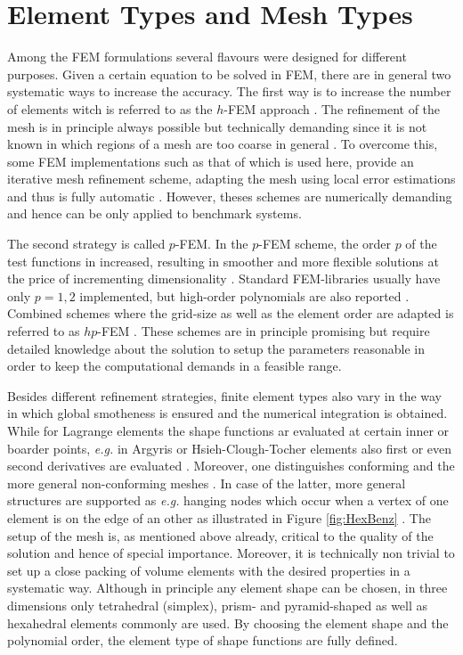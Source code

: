 \section{Element Types and Mesh Types}
\label{ch:feAss}
Among the FEM formulations several flavours were designed for different purposes.
Given a certain equation to be solved in FEM, there are in general two systematic ways to increase the accuracy.
The first way is to increase the number of elements witch is referred to as the $h$-FEM approach \cite{dreyer,}.
The refinement of the mesh is in principle always possible but technically demanding since it is not known in which regions of a mesh are too coarse in general \cite{dreyer}.
To overcome this, some FEM implementations such as that of  \cite{libmesh} which is used here, provide an iterative mesh refinement scheme, adapting the mesh using local error estimations and thus is fully automatic \cite{libmesh}.
However, theses schemes are numerically demanding and hence can be only applied to benchmark systems.

The second strategy is called $p$-FEM. 
In the $p$-FEM scheme, the order $p$ of the test functions in increased, resulting in smoother and more flexible solutions at the price of incrementing dimensionality \cite{p-fem}.
Standard FEM-libraries usually have only $p=1,2$ implemented, but high-order polynomials are also reported \cite{hermes}.
Combined schemes where the grid-size as well as the element order are adapted is referred to as $hp$-FEM \cite{hp-fem}.
These schemes are in principle promising but require detailed knowledge about the solution to setup the parameters reasonable in order to keep the computational demands in a feasible range.

Besides different refinement strategies, finite element types also vary in the way in which global smotheness is ensured and the numerical integration is obtained.
While for Lagrange elements the shape functions ar evaluated at certain inner or boarder points, \textit{e.g.} in Argyris or Hsieh-Clough-Tocher elements also first or even second derivatives are evaluated \cite{femPraxis,femCiarlet}.
Moreover, one distinguishes conforming and the more general non-conforming meshes \cite{nonconfFEM}. In case of the latter, more general structures are supported as \textit{e.g.} hanging nodes which occur when a vertex of one element is on the edge of an other as illustrated in Figure \ref{fig:HexBenz} \cite{femCiarlet}.
The setup of the mesh is, as mentioned above already, critical to the quality of the solution and hence of special importance.
Moreover, it is technically non trivial to set up a close packing of volume elements with the desired properties in a systematic way.
Although in principle any element shape can be chosen, in three dimensions only tetrahedral (simplex), prism- and pyramid-shaped as well as hexahedral elements commonly are used.
By choosing the element shape and the polynomial order, the element type of shape functions are fully defined.

